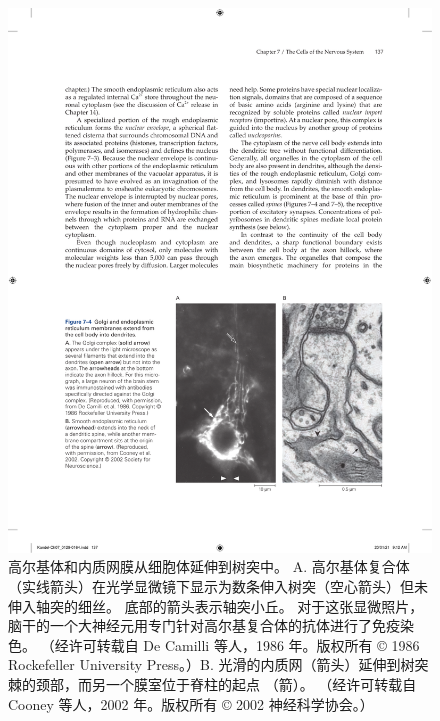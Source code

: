 \begin{figure}[htbp]
	\centering
	\includegraphics[width=0.7\linewidth]{chap07/fig_7_4}
	\caption{高尔基体和内质网膜从细胞体延伸到树突中。 A. 高尔基体复合体（实线箭头）在光学显微镜下显示为数条伸入树突（空心箭头）但未伸入轴突的细丝。 底部的箭头表示轴突小丘。 对于这张显微照片，脑干的一个大神经元用专门针对高尔基复合体的抗体进行了免疫染色。 （经许可转载自 De Camilli 等人，1986 年。版权所有 © 1986 Rockefeller University Press。）B. 光滑的内质网（箭头）延伸到树突棘的颈部，而另一个膜室位于脊柱的起点 （箭）。 （经许可转载自 Cooney 等人，2002 年。版权所有 © 2002 神经科学协会。）}
	\label{fig:7_4}
\end{figure}


